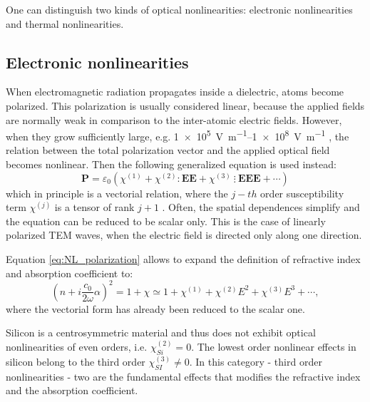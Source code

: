 One can distinguish two kinds of optical nonlinearities: electronic nonlinearities and thermal nonlinearities.


\subsection{Electronic nonlinearities}
\label{ssec:Electronic_nonlinearities}
When electromagnetic radiation propagates inside a dielectric, atoms become polarized.
This polarization is usually considered linear, because the applied fields are normally weak in comparison to the inter-atomic electric fields.
However, when they grow sufficiently large, e.g. \SIrange[retain-unity-mantissa = false,range-units = single]{1e5}{1e8}{\V\per\m} \cite{Saleh1991}, the relation between the total polarization vector and the applied optical field becomes nonlinear.
Then the following generalized equation is used instead:
\begin{equation}
\textbf{P} = \varepsilon_0 \left(\chi^{(1)} + \chi^{(2)}:\textbf{EE}+\chi^{(3)}~\vdots~\textbf{EEE} + \cdots \right)
\label{eq:NL_polarization}
\end{equation}
which in principle is a vectorial relation, where the $j-th$ order susceptibility term $\chi^{(j)}$ is a tensor of rank $j+1$ \cite{Agrawal2001}.
Often, the spatial dependences simplify and the equation can be reduced to be scalar only.
This is the case of linearly polarized \ac{TEM} waves, when the electric field is directed only along one direction.

Equation \ref{eq:NL_polarization} allows to expand the definition of refractive index and absorption coefficient to:
\begin{equation}
	\left( n+i\frac{c_0}{2\omega}\alpha \right)^2 = 1+\chi
	\simeq 1 + \chi^{(1)} + \chi^{(2)} E^2 + \chi^{(3)} E^3 + \cdots,
\end{equation}
where the vectorial form has already been reduced to the scalar one.

Silicon is a centrosymmetric material and thus does not exhibit optical nonlinearities of even orders, i.e. $\chi^{(2)}_{Si} = 0$.
The lowest order nonlinear effects in silicon belong to the third order $\chi^{(3)}_{SI}\neq 0$.
In this category - third order nonlinearities - two are the fundamental effects that modifies the refractive index and the absorption coefficient.

